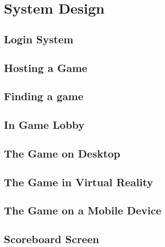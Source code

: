 
\chapter{System Design}

\section{Login System}

\section{Hosting a Game}

\section{Finding a game}

\section{In Game Lobby}

\section{The Game on Desktop}

\section{The Game in Virtual Reality}

\section{The Game on a Mobile Device}

\section{Scoreboard Screen}
